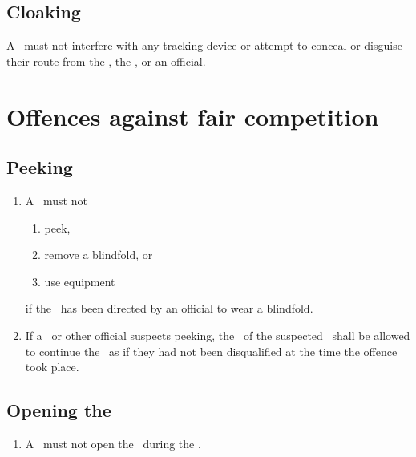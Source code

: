 \documentclass[12pt]{report}
\begin{document}
  \section{Cloaking}
  \begin{fenumerate}
    \item A \team\ must not interfere with any tracking device or attempt to conceal or disguise their route from the \RaceDirector, the \Referee, or an official.

  \end{fenumerate}
  \chapter{Offences against fair competition}
  \section{Peeking}
  \begin{enumerate}
    \item A \competitor\ must not
    \begin{enumerate}
      \item peek,
      \item remove a blindfold, or
      \item use equipment
    \end{enumerate}
    if the \competitor\ has been directed by an official to wear a blindfold.

    \item If a \LeadDriver\ or other official suspects peeking, the \team\ of the suspected \competitor\ shall be allowed to continue the \race\ as if they had not been disqualified at the time the offence took place.
  \end{enumerate}
  \section{Opening the \TeamEnvelope}
  \begin{enumerate}
     \item[] A \team\ must not open the \TeamEnvelope\ during the \race.


  \end{enumerate}
\end{document}
